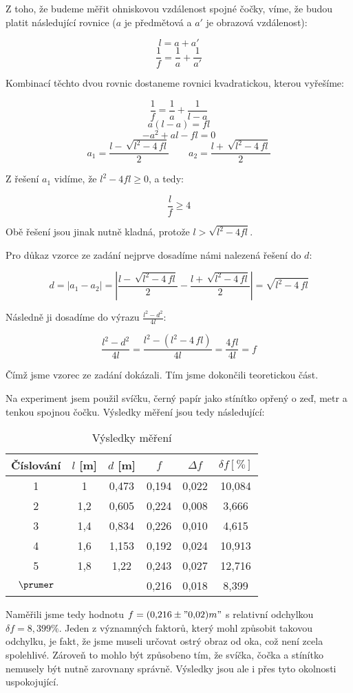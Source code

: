 \documentclass{fkssolpub}
\author{Ondřej Sedláček}
\begin{document}
Z toho, že budeme měřit ohniskovou vzdálenost spojné čočky, víme, že budou platit následující rovnice ($a$ je předmětová a $a'$ je obrazová vzdálenost):

\[
	l = a + a'
\]
\[
	\frac{1}{f} = \frac{1}{a} + \frac{1}{a'}
\]

Kombinací těchto dvou rovnic dostaneme rovnici kvadratickou, kterou vyřešíme:

\[
	\frac{1}{f} = \frac{1}{a} + \frac{1}{l - a}
\]
\[
	a (l - a) = f l
\]
\[
	- a^2 + a l - fl = 0
\]
\[
	a_1 = \frac{l - \, \sqrt{l^{2}-4 \, f l}}{2} \qquad a_2 = \frac{l + \, \sqrt{l^{2} - 4 \, f l}}{2}
\]

Z řešení $a_1$ vidíme, že $l^2 - 4 fl \geq 0$, a tedy:

\[
	\frac{l}{f} \geq 4
\]

Obě řešení jsou jinak nutně kladná, protože $l > \sqrt{l^2 - 4 f l}$.

Pro důkaz vzorce ze zadání nejprve dosadíme námi nalezená řešení do $d$:

\[
	d = |a_1 - a_2| =  \left| \frac{l - \, \sqrt{l^{2}-4 \, f l}}{2} - \frac{l + \, \sqrt{l^{2} - 4 \, f l}}{2} \right| = \sqrt{l^{2} - 4 \, f l}
\]

Následně ji dosadíme do výrazu $\frac{l^2 - d^2}{4l}$:

\[
	\frac{l^2 - d^2}{4l} = \frac{l^2 - (l^{2} - 4 \, f l)}{4l} = \frac{4fl}{4l} = f
\]

Čímž jsme vzorec ze zadání dokázali. Tím jsme dokončili teoretickou část.

Na experiment jsem použil svíčku, černý papír jako stínítko opřený o zeď, metr a tenkou spojnou čočku. Výsledky měření jsou tedy následující:

\begin{table}[h!]
	\caption{Výsledky měření}\label{tab:1}
	\begin{center}
		\begin{tabular}{|c|c|c|c|c|c|}
			\hline
			Číslování & $l$ [m] & $d$ [m] & $f$   & $\Delta f$ & $\delta f [\%]$ \\
			\hline
			1 & 1 & 0,473 & 0,194 & 0,022 & 10,084  \\
			2 & 1,2 & 0,605 & 0,224 & 0,008 & 3,666  \\
			3 & 1,4 & 0,834 & 0,226 & 0,010 & 4,615  \\
			4 & 1,6 & 1,153 & 0,192 & 0,024 & 10,913  \\
			5 & 1,8 & 1,22 & 0,243 & 0,027 & 12,716  \\
 			$\prumer$ &  &  & 0,216 & 0,018 & 8,399  \\
			\hline
		\end{tabular}
	\end{center}
\end{table}

Naměřili jsme tedy hodnotu $f = (0{,}216 \pm "0{,}02) m"$ s relativní odchylkou $\delta f = 8{,}399 \%$. Jeden z významných faktorů, který mohl způsobit takovou odchylku, je fakt, že jsme museli určovat ostrý obraz od oka, což není zcela spolehlivé. Zároveň to mohlo být způsobeno tím, že svíčka, čočka a stínítko nemusely být nutně zarovnany správně. Výsledky jsou ale i přes tyto okolnosti uspokojující.
\end{document}
